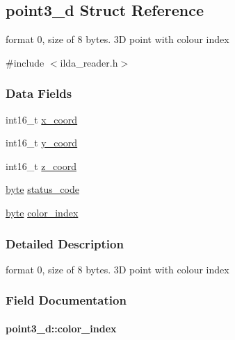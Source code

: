 \hypertarget{structpoint3__d}{}\subsection{point3\+\_\+d Struct Reference}
\label{structpoint3__d}


format 0, size of 8 bytes. 3D point with colour index  




{\ttfamily \#include $<$ilda\+\_\+reader.\+h$>$}

\subsubsection*{Data Fields}
\begin{DoxyCompactItemize}
\item 
int16\+\_\+t \hyperlink{structpoint3__d_a82eab6ff9df48322e3252c6556db05e3}{x\+\_\+coord}
\item 
int16\+\_\+t \hyperlink{structpoint3__d_a1ccb895cc6619f81c02aec641282ebcb}{y\+\_\+coord}
\item 
int16\+\_\+t \hyperlink{structpoint3__d_acf2babaff2830180190d111c8958f6af}{z\+\_\+coord}
\item 
\hyperlink{ilda__reader_8h_a0c8186d9b9b7880309c27230bbb5e69d}{byte} \hyperlink{structpoint3__d_ac46953a940fbb65ffed780bcb5ac2ecc}{status\+\_\+code}
\item 
\hyperlink{ilda__reader_8h_a0c8186d9b9b7880309c27230bbb5e69d}{byte} \hyperlink{structpoint3__d_a4db0c777246f6ac7f4d0fc72111e947b}{color\+\_\+index}
\end{DoxyCompactItemize}


\subsubsection{Detailed Description}
format 0, size of 8 bytes. 3D point with colour index 

\subsubsection{Field Documentation}
\paragraph[{\texorpdfstring{color\+\_\+index}{color_index}}]{ point3\+\_\+d\+::color\+\_\+index}\hypertarget{structpoint3__d_a4db0c777246f6ac7f4d0fc72111e947b}{}\label{structpoint3__d_a4db0c777246f6ac7f4d0fc72111e947b}
